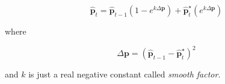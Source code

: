 \begin{equation}
    \hat{\boldsymbol{p}}_{t} = \hat{\boldsymbol{p}}_{t-1} (1-e^{k\Delta{\boldsymbol{p}}}) + \hat{\boldsymbol{p}}^{\star}_{t}(e^{k\Delta{\boldsymbol{p}}})
\end{equation}

where

\begin{equation}
    \Delta{\boldsymbol{p}} = (\hat{\boldsymbol{p}}_{t-1} - \hat{\boldsymbol{p}}_t^\star)^2
\end{equation}

and $k$ is just a real negative constant called \emph{smooth factor}.
